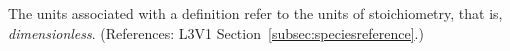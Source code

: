 The units associated with a \SpeciesReference definition refer to the
units of stoichiometry, that is, \emph{dimensionless}.  (References: 
L3V1 Section~\ref{subsec:speciesreference}.)
